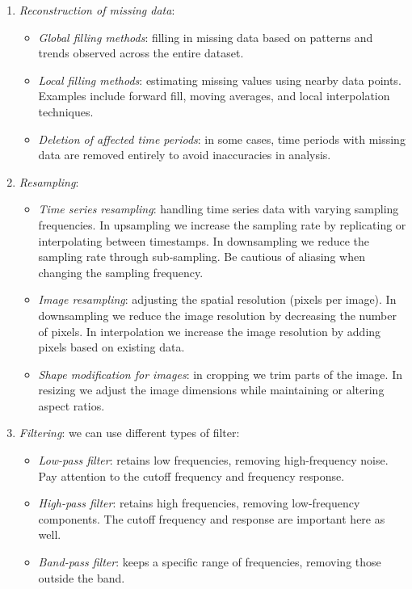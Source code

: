 \begin{enumerate}
    \item \textit{Reconstruction of missing data}:
        \begin{itemize}
            \item \textit{Global filling methods}: filling in missing data based on patterns and trends observed across the entire dataset.
            \item \textit{Local filling methods}: estimating missing values using nearby data points. Examples include forward fill, moving averages, and local interpolation techniques.
            \item \textit{Deletion of affected time periods}: in some cases, time periods with missing data are removed entirely to avoid inaccuracies in analysis.
        \end{itemize}
    \item \textit{Resampling}:
        \begin{itemize}
            \item \textit{Time series resampling}: handling time series data with varying sampling frequencies.
                In upsampling we increase the sampling rate by replicating or interpolating between timestamps.
                In downsampling we reduce the sampling rate through sub-sampling.
                Be cautious of aliasing when changing the sampling frequency.
            \item \textit{Image resampling}: adjusting the spatial resolution (pixels per image).
                In downsampling we reduce the image resolution by decreasing the number of pixels.
                In interpolation we increase the image resolution by adding pixels based on existing data.
            \item \textit{Shape modification for images}: in cropping we trim parts of the image.
                In resizing we adjust the image dimensions while maintaining or altering aspect ratios.
        \end{itemize}
    \item \textit{Filtering}: we can use different types of filter: 
        \begin{itemize}
            \item \textit{Low-pass filter}: retains low frequencies, removing high-frequency noise. Pay attention to the cutoff frequency and frequency response.
            \item \textit{High-pass filter}: retains high frequencies, removing low-frequency components. The cutoff frequency and response are important here as well.
            \item \textit{Band-pass filter}: keeps a specific range of frequencies, removing those outside the band.
        \end{itemize}
\end{enumerate}

